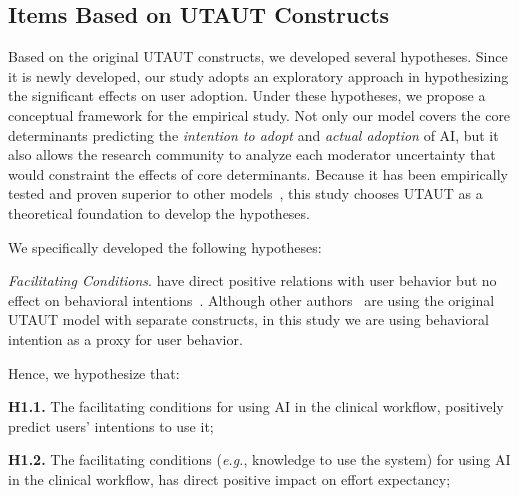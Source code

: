 \subsection{Items Based on UTAUT Constructs}
\label{sec:chap004003001}

Based on the original UTAUT constructs, we developed several hypotheses.
Since it is newly developed, our study adopts an exploratory approach in hypothesizing the significant effects on user adoption.
Under these hypotheses, we propose a conceptual framework for the empirical study.
Not only our model covers the core determinants predicting the {\it intention to adopt} and {\it actual adoption} of AI, but it also allows the research community to analyze each moderator uncertainty that would constraint the effects of core determinants.
Because it has been empirically tested and proven superior to other models~\cite{AJZEN1991179, RePEc:inm:ormnsc:v:35:y:1989:i:8:p:982-1003}, this study chooses UTAUT as a theoretical foundation to develop the hypotheses.

\vspace{2.25mm}

\noindent
We specifically developed the following hypotheses:

\vspace{2.25mm}

{\it Facilitating Conditions}. have direct positive relations with user behavior but no effect on behavioral intentions~\cite{10.2307/30036540}.
Although other authors~\cite{KHALILZADEH2017460} are using the original UTAUT model with separate constructs, in this study we are using behavioral intention as a proxy for user behavior.

\vspace{2.25mm}

\noindent
Hence, we hypothesize that:

\vspace{2.25mm}

\noindent
{\bf H1.1.} The facilitating conditions for using AI in the clinical workflow, positively predict users' intentions to use it;

\vspace{2.25mm}

\noindent
{\bf H1.2.} The facilitating conditions ({\it e.g.}, knowledge to use the system) for using AI in the clinical workflow, has direct positive impact on effort expectancy;

\vspace{2.25mm}


